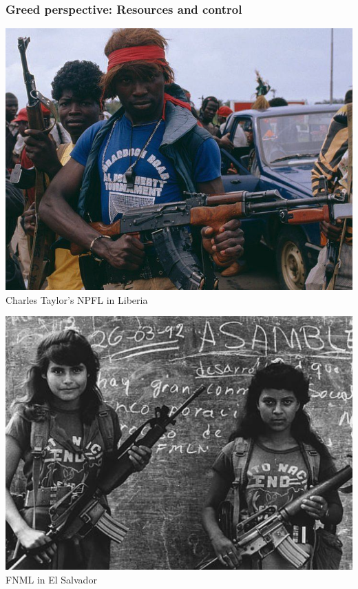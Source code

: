 \documentclass[aspectratio=43]{beamer}
\begin{document}
\begin{frame}
\frametitle{Greed perspective: Resources and control}
\centering

\begin{minipage}{0.49\textwidth}\centering
\includegraphics[width = \textwidth]{img/liberia}\\Charles Taylor's NPFL in Liberia
\end{minipage}\hfill
\begin{minipage}{0.49\textwidth}\centering
\includegraphics[width = \textwidth]{img/fmln}\\FNML in El Salvador
\end{minipage}

\end{frame}
\end{document}
